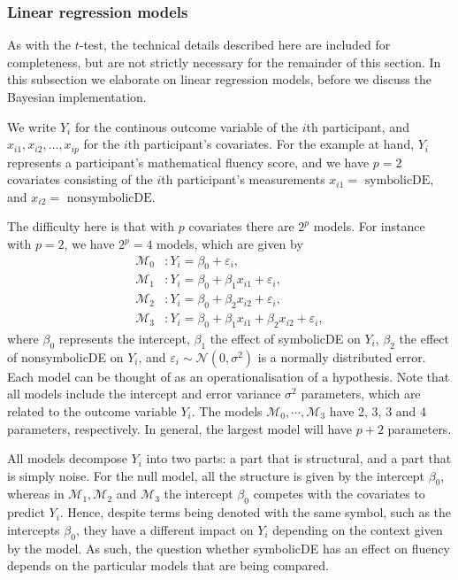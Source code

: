 \documentclass[english,,doc,floatsintext]{apa6}
\begin{document}
\hypertarget{linear-regression-models}{%
\subsubsection{Linear regression models}\label{linear-regression-models}}

As with the \(t\)-test, the technical details described here are included for completeness, but are not strictly necessary for the remainder of this section. In this subsection we elaborate on linear regression models, before we discuss the Bayesian implementation.

We write \(Y_{i}\) for the continous outcome variable of the \(i\)th participant, and \(x_{i1}, x_{i2}, \ldots, x_{ip}\) for the \(i\)th participant's covariates. For the example at hand, \(Y_{i}\) represents a participant's mathematical fluency score, and we have \(p=2\) covariates consisting of the \(i\)th participant's measurements \(x_{i1}=\text{ symbolicDE}\), and \(x_{i2}=\text{ nonsymbolicDE}\).

The difficulty here is that with \(p\) covariates there are \(2^{p}\) models. For instance with \(p=2\), we have \(2^{p} = 4\) models, which are given by
\begin{align*}
\mathcal{M}_{0} & : Y_{i} =\beta_{0} + \varepsilon_{i}, \\
\mathcal{M}_{1} & : Y_{i} =\beta_{0} + \beta_{1} x_{i1} + \varepsilon_{i}, \\
\mathcal{M}_{2} & : Y_{i} =\beta_{0} + \beta_{2} x_{i2} + \varepsilon_{i}, \\
\mathcal{M}_{3} & : Y_{i} =\beta_{0} + \beta_{1} x_{i1} + \beta_{2} x_{i2} + \varepsilon_{i},
\end{align*}
where \(\beta_{0}\) represents the intercept, \(\beta_{1}\) the effect of symbolicDE on \(Y_{i}\), \(\beta_{2}\) the effect of nonsymbolicDE on \(Y_{i}\), and \(\varepsilon_{i} \sim \mathcal{N}(0, \sigma^{2})\) is a normally distributed error. Each model can be thought of as an operationalisation of a hypothesis. Note that all models include the intercept and error variance \(\sigma^{2}\) parameters, which are related to the outcome variable \(Y_{i}\). The models \(\mathcal{M}_{0},\cdots,\mathcal{M}_{3}\) have 2, 3, 3 and 4 parameters, respectively. In general, the largest model will have \(p + 2\) parameters.

All models decompose \(Y_{i}\) into two parts: a part that is structural, and a part that is simply noise. For the null model, all the structure is given by the intercept \(\beta_{0}\), whereas in \(\mathcal{M}_{1}, \mathcal{M}_{2}\) and \(\mathcal{M}_{3}\) the intercept \(\beta_{0}\) competes with the covariates to predict \(Y_{i}\). Hence, despite terms being denoted with the same symbol, such as the intercepts \(\beta_{0}\), they have a different impact on \(Y_{i}\) depending on the context given by the model. As such, the question whether symbolicDE has an effect on fluency depends on the particular models that are being compared.
\end{document}
